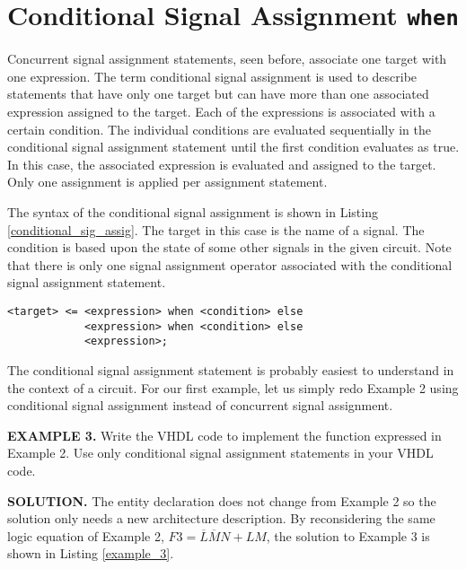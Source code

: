 \section{Conditional Signal Assignment \texttt{when}}
Concurrent signal assignment statements, seen before, associate one target with one expression. The term conditional signal assignment is used to describe statements that have only one target but can have more than one associated expression assigned to the target. Each of the expressions is associated with a certain condition. The individual conditions are evaluated sequentially in the conditional signal assignment statement until the first condition evaluates as true. In this case, the associated expression is evaluated and assigned to the target. Only one assignment is applied per assignment statement.

The syntax of the conditional signal assignment is shown in Listing \ref{conditional_sig_assig}. The target in this case is the name of a signal. The condition is based upon the state of some other signals in the given circuit. Note that there is only one signal assignment operator associated with the conditional signal assignment statement.

\noindent
\begin{minipage}{0.99\linewidth}
\begin{lstlisting}[label=conditional_sig_assig, caption=The syntax for the conditional signal assignment statement.]
<target> <=	<expression> when <condition> else
			<expression> when <condition> else
			<expression>;
\end{lstlisting}
\end{minipage}

The conditional signal assignment statement is probably easiest to understand in the context of a circuit. For our first example, let us simply redo Example 2 using conditional signal assignment instead of concurrent signal assignment.

\begin{leftbar}
\noindent
\textbf{EXAMPLE 3.}
Write the VHDL code to implement the function expressed in Example 2. Use only conditional signal assignment statements in your VHDL code. 
\end{leftbar}
\noindent
\textbf{SOLUTION.} The entity declaration does not change from Example 2 so the solution only needs a new architecture description. By reconsidering the same logic equation of Example 2, $F3=\overline{L}\overline{M}N+LM$, the solution to Example 3 is shown in Listing \ref{example_3}.

